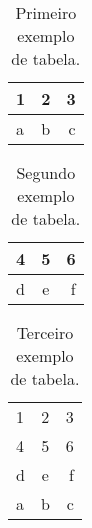 %
\begin{table}[htbp]
  \centering
  \caption{Primeiro exemplo de tabela.}
  \label{tab:table1}
  \begin{tabular}{l|c||r}
    1 & 2 & 3\\
    \hline
    a & b & c\\
  \end{tabular}
\end{table}
%
\begin{table}[htbp]
  \centering
  \caption{Segundo exemplo de tabela.}
  \label{tab:table2}
  \begin{tabular}{l|c||r}
    4 & 5 & 6\\
    \hline
    d & e & f\\
  \end{tabular}
\end{table}
%
\begin{table}[htbp]
  \centering
  \caption{Terceiro exemplo de tabela.}
  \label{tab:table3}
  \begin{tabular}{l|c||r}
    1 & 2 & 3\\
    4 & 5 & 6\\
    \hline
    d & e & f\\
    a & b & c\\
  \end{tabular}
\end{table}
%
